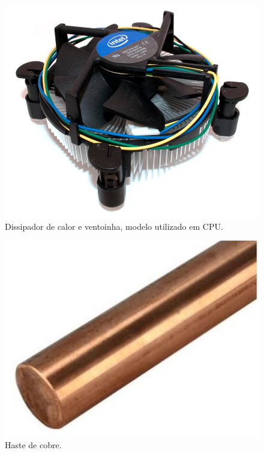 \begin{figure}[h]
    \centering
    \includegraphics[scale=0.20]{figuras/projeto/controle/cooler.png}
    \caption{Dissipador de calor e ventoinha, modelo utilizado em CPU.}
    \label{fig:cooler}
\end{figure}


\begin{figure}[h]
    \centering
    \includegraphics[scale=0.30]{figuras/projeto/controle/haste.png}
    \caption{Haste de cobre.}
    \label{fig:haste_cobre}
\end{figure}
